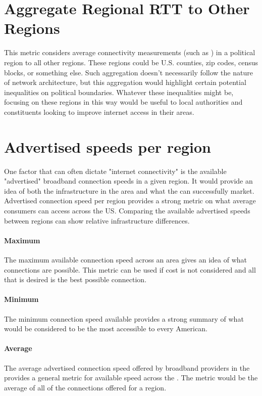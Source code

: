 \section{Aggregate Regional RTT to Other Regions}

This metric considers average connectivity measurements (such as \rtt) in a political region to all other regions. These regions could be U.S. counties, zip codes, census blocks, or something else. Such aggregation doesn't necessarily follow the nature of network architecture, but this aggregation would highlight certain potential inequalities on political boundaries. Whatever these inequalities might be, focusing on these regions in this way would be useful to local authorities and constituents looking to improve internet access in their areas.

\section{Advertised speeds per region}
One factor that can often dictate "internet connectivity" is the available "advertised" broadband connection speeds in a given region. It would provide an idea of both the infrastructure in the area and what the \isp can successfully market. Advertised connection speed per region provides a strong metric on what average consumers can access across the US. Comparing the available advertised speeds between regions can show relative infrastructure differences.

\paragraph{Maximum}
The maximum available connection speed across an area gives an idea of what connections are possible. This metric can be used if cost is not considered and all that is desired is the best possible connection.

\paragraph{Minimum}
The minimum connection speed available provides a strong summary of what would be considered to be the most accessible to every American.

\paragraph{Average}
The average advertised connection speed offered by broadband providers in the \us provides a general metric for available speed across the \us. The metric would be the average of all of the connections offered for a region.

